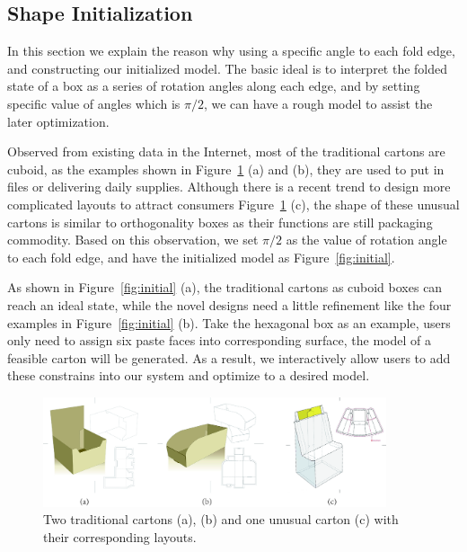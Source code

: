
\subsection{Shape Initialization}\label{sec:initialization}


In this section we explain the reason why using a specific angle to each fold edge, and constructing our initialized model. The basic ideal is to interpret the folded state of a box as a series of rotation angles along each edge, and by setting specific value of angles which is $\pi/2$, we can have a rough model to assist the later optimization.
		
Observed from existing data in the Internet, most of the traditional cartons are cuboid, as the examples shown in Figure~\ref{fig:realdata} (a) and (b), they are used to put in files or delivering daily supplies. Although there is a recent trend to design more complicated layouts to attract consumers Figure~\ref{fig:realdata} (c), the shape of these unusual cartons is similar to orthogonality boxes as their functions are still packaging commodity. Based on this observation, we set $\pi/2$ as the value of rotation angle to each fold edge, and have the initialized model as Figure~\ref{fig:initial}.

As shown in Figure~\ref{fig:initial} (a), the traditional cartons as cuboid boxes can reach an ideal state, while the novel designs need a little refinement like the four examples in Figure~\ref{fig:initial} (b). Take the hexagonal box as an example, users only need to assign six paste faces into corresponding surface, the model of a feasible carton will be generated. As a result, we interactively allow users to add these constrains into our system and optimize to a desired model.

\begin{figure}
	\centering
	\includegraphics[width=0.9\textwidth]{images/realdata.jpg}
	\caption{Two traditional cartons (a), (b) and one unusual carton (c) with their corresponding layouts.}
	\label{fig:realdata}
\end{figure}

